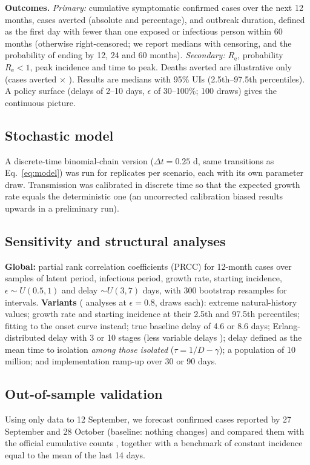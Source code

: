 \documentclass[11pt,a4paper]{article}
\newcommand{\Rt}{R_{\mathrm{e}}}
\begin{document}
\textbf{Outcomes.} \emph{Primary:} cumulative symptomatic confirmed cases over the next 12 months, cases averted (absolute and percentage), and outbreak duration, defined as the first day with fewer than one exposed or infectious person within 60 months (otherwise right-censored; we report medians with censoring, and the probability of ending by 12, 24 and 60 months). \emph{Secondary:} $\Rt$, probability $\Rt<1$, peak incidence and time to peak. Deaths averted are illustrative only (cases averted $\times$ \cfrAssumed). Results are medians with 95\% UIs (2.5th--97.5th percentiles). A policy surface (delays of 2--10 days, $\epsilon$ of 30--100\%; 100 draws) gives the continuous picture.

\subsection{Stochastic model}
A discrete-time binomial-chain version ($\Delta t=0.25$ d, same transitions as Eq.~\ref{eq:model}) was run for \nStoch{} replicates per scenario, each with its own parameter draw. Transmission was calibrated in discrete time so that the expected growth rate equals the deterministic one (an uncorrected calibration biased results upwards in a preliminary run).

\subsection{Sensitivity and structural analyses}
\textbf{Global:} partial rank correlation coefficients (PRCC) \citep{blower1994,marino2008} for 12-month cases over \nPRCC{} samples of latent period, infectious period, growth rate, starting incidence, $\epsilon\sim U(0.5,1)$ and delay $\sim U(3,7)$ days, with 300 bootstrap resamples for intervals. \textbf{Variants} (\nVariants{} analyses at $\epsilon=0.8$, \nVarDraws{} draws each): extreme natural-history values; growth rate and starting incidence at their 2.5th and 97.5th percentiles; fitting to the onset curve instead; true baseline delay of 4.6 or 8.6 days; Erlang-distributed delay with 3 or 10 stages (less variable delays \citep{lloyd2001}); delay defined as the mean time to isolation \emph{among those isolated} ($\tau=1/D-\gamma$); a population of 10 million; and implementation ramp-up over 30 or 90 days.

\subsection{Out-of-sample validation}
Using only data to 12 September, we forecast confirmed cases reported by 27 September and 28 October (baseline: nothing changes) and compared them with the official cumulative counts \citep{ukhsa2026,cdcsituation2026}, together with a benchmark of constant incidence equal to the mean of the last 14 days.
\end{document}
